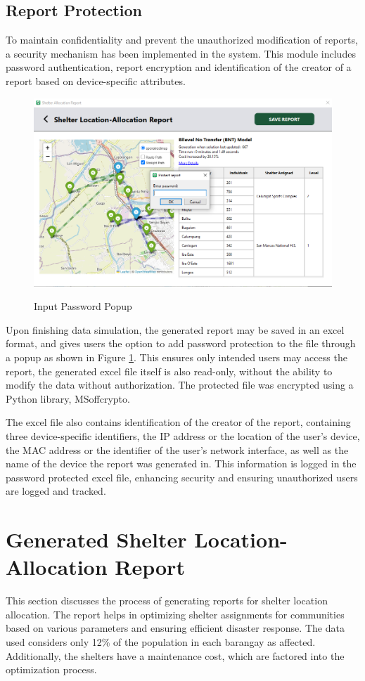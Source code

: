 \subsection{Report Protection}
	To maintain confidentiality and prevent the unauthorized modification of reports, a security mechanism has been implemented in the system. This module includes password authentication, report encryption and identification of the creator of a report based on device-specific attributes.
	
	\begin{figure}[h!]
		\caption{Input Password Popup}
		\centering
		\includegraphics[width=4.5in]{Chapter 4/alloc report pass}
		\label{passPop}
	\end{figure}
	Upon finishing data simulation, the generated report may be saved in an excel format, and gives users the option to add password protection to the file through a popup as shown in Figure \ref{passPop}. This ensures only intended users may access the report, the generated excel file itself is also read-only, without the ability to modify the data without authorization. The protected file was encrypted using a Python library, MSoffcrypto.
	
	The excel file also contains identification of the creator of the report, containing three device-specific identifiers, the IP address or the location of the user’s device, the MAC address or the identifier of the user’s network interface, as well as the name of the device the report was generated in. This information is logged in the password protected excel file, enhancing security and ensuring unauthorized users are logged and tracked. 
	
\section{Generated Shelter Location-Allocation Report}
	This section discusses the process of generating reports for shelter location allocation. The report helps in optimizing shelter assignments for communities based on various parameters and ensuring efficient disaster response. The data used considers only 12\% of the population in each barangay as affected. Additionally, the shelters have a maintenance cost, which are factored into the optimization process.
	

